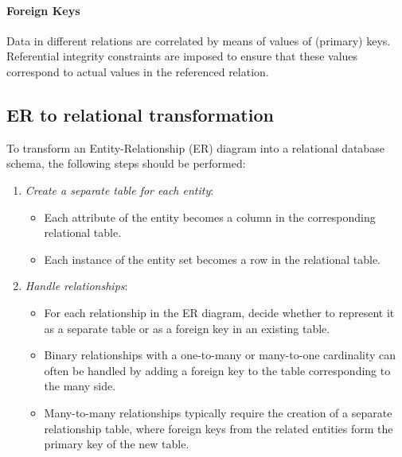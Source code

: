 \paragraph*{Foreign Keys}
Data in different relations are correlated by means of values of (primary) keys. 
Referential integrity constraints are imposed to ensure that these values correspond to actual values in the referenced relation.

\subsection{ER to relational transformation}
To transform an Entity-Relationship (ER) diagram into a relational database schema, the following steps should be performed:
\begin{enumerate}
    \item \textit{Create a separate table for each entity}:
        \begin{itemize}
            \item Each attribute of the entity becomes a column in the corresponding relational table.
            \item Each instance of the entity set becomes a row in the relational table.
        \end{itemize}
    \item \textit{Handle relationships}:
        \begin{itemize}
            \item For each relationship in the ER diagram, decide whether to represent it as a separate table or as a foreign key in an existing table.
            \item Binary relationships with a one-to-many or many-to-one cardinality can often be handled by adding a foreign key to the table corresponding to the many side.
            \item Many-to-many relationships typically require the creation of a separate relationship table, where foreign keys from the related entities form the primary key of the new table.
        \end{itemize}
\end{enumerate}